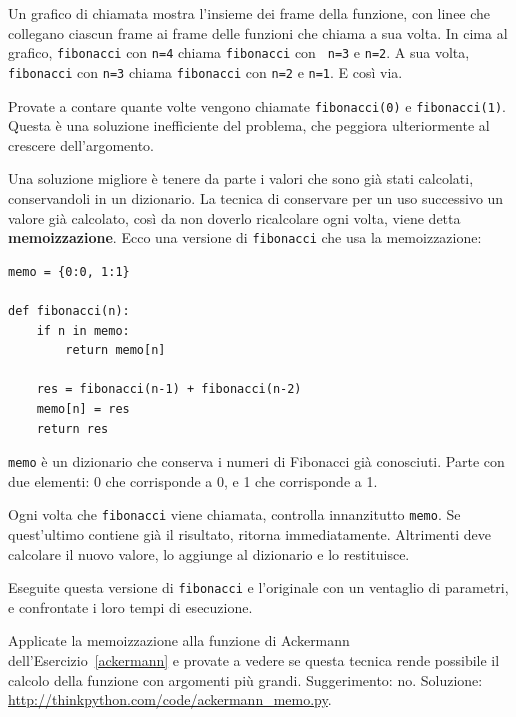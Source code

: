 \documentclass[10pt]{book}
\begin{document}
Un grafico di chiamata mostra l'insieme dei frame della funzione, con linee che collegano ciascun frame ai frame delle funzioni che chiama a sua volta. In cima al grafico, {\tt fibonacci} con {\tt n=4} chiama {\tt fibonacci} con {\tt
n=3} e {\tt n=2}.  A sua volta, {\tt fibonacci} con {\tt n=3} chiama
{\tt fibonacci} con {\tt n=2} e {\tt n=1}.  E così via.

Provate a contare quante volte vengono chiamate {\tt fibonacci(0)} e {\tt fibonacci(1)}. Questa è una soluzione inefficiente del problema, che peggiora ulteriormente al crescere dell'argomento.

Una soluzione migliore è tenere da parte i valori che sono già stati calcolati, conservandoli in un dizionario. La tecnica di conservare per un uso successivo un valore già calcolato, così da non doverlo ricalcolare ogni volta, viene detta {\bf memoizzazione}.  Ecco una versione di {\tt fibonacci} che usa la memoizzazione:

\begin{verbatim}
memo = {0:0, 1:1}

def fibonacci(n):
    if n in memo:
        return memo[n]

    res = fibonacci(n-1) + fibonacci(n-2)
    memo[n] = res
    return res
\end{verbatim}
%
{\tt memo} è un dizionario che conserva i numeri di Fibonacci già conosciuti. Parte con due elementi: 0 che corrisponde a 0, e 1 che corrisponde a 1.

Ogni volta che {\tt fibonacci} viene chiamata, controlla innanzitutto {\tt memo}.
Se quest'ultimo contiene già il risultato, ritorna immediatamente. Altrimenti deve calcolare il nuovo valore, lo aggiunge al dizionario e lo restituisce.

\vspace{0.2in}
\begin{exercise}

Eseguite questa versione di {\tt fibonacci} e l'originale con un ventaglio di parametri, e confrontate i loro tempi di esecuzione.

\end{exercise}

\vspace{0.2in}
\begin{exercise}

Applicate la memoizzazione alla funzione di Ackermann dell'Esercizio~\ref{ackermann} e provate a vedere se questa tecnica rende possibile il calcolo della funzione con argomenti più grandi. Suggerimento: no.
Soluzione: \url{http://thinkpython.com/code/ackermann_memo.py}.

\end{exercise}
\end{document}
